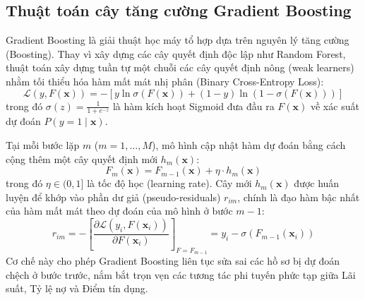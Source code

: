 \documentclass[12pt,a4paper,oneside]{report}
\begin{document}
\subsection{Thuật toán cây tăng cường Gradient Boosting}
Gradient Boosting là giải thuật học máy tổ hợp dựa trên nguyên lý tăng cường (Boosting). Thay vì xây dựng các cây quyết định độc lập như Random Forest, thuật toán xây dựng tuần tự một chuỗi các cây quyết định nông (weak learners) nhằm tối thiểu hóa hàm mất mát nhị phân (Binary Cross-Entropy Loss):
\begin{equation}
    \mathcal{L}(y, F(\mathbf{x})) = -\left[ y \ln \sigma(F(\mathbf{x})) + (1 - y) \ln (1 - \sigma(F(\mathbf{x}))) \right]
\end{equation}
trong đó $\sigma(z) = \frac{1}{1 + e^{-z}}$ là hàm kích hoạt Sigmoid đưa đầu ra $F(\mathbf{x})$ về xác suất dự đoán $P(y = 1 \mid \mathbf{x})$.

Tại mỗi bước lặp $m$ ($m = 1, \dots, M$), mô hình cập nhật hàm dự đoán bằng cách cộng thêm một cây quyết định mới $h_m(\mathbf{x})$:
\begin{equation}
    F_m(\mathbf{x}) = F_{m-1}(\mathbf{x}) + \eta \cdot h_m(\mathbf{x})
\end{equation}
trong đó $\eta \in (0, 1]$ là tốc độ học (learning rate). Cây mới $h_m(\mathbf{x})$ được huấn luyện để khớp vào phần dư giả (pseudo-residuals) $r_{im}$, chính là đạo hàm bậc nhất của hàm mất mát theo dự đoán của mô hình ở bước $m-1$:
\begin{equation}
    r_{im} = -\left[ \frac{\partial \mathcal{L}(y_i, F(\mathbf{x}_i))}{\partial F(\mathbf{x}_i)} \right]_{F = F_{m-1}} = y_i - \sigma(F_{m-1}(\mathbf{x}_i))
\end{equation}
Cơ chế này cho phép Gradient Boosting liên tục sửa sai các hồ sơ bị dự đoán chệch ở bước trước, nắm bắt trọn vẹn các tương tác phi tuyến phức tạp giữa Lãi suất, Tỷ lệ nợ và Điểm tín dụng.
\end{document}
